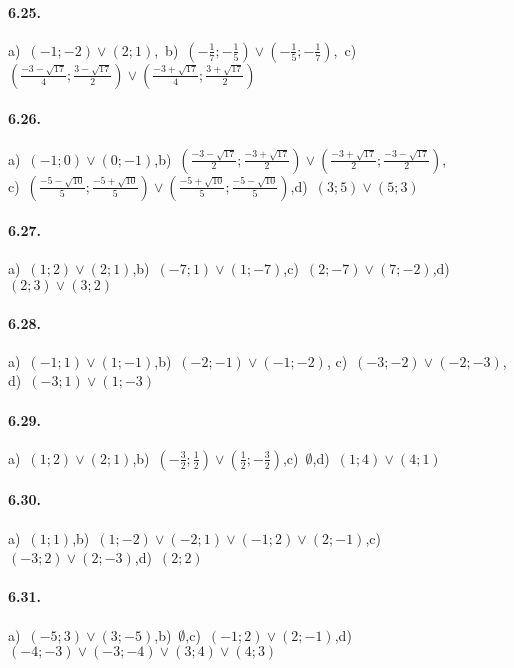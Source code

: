 \paragraph{6.25.} a)~$ (-1; -2)\vee(2;1) $,\, b)~$\left(-\frac 1 7;-\frac 1 5\right)\vee\left(-\frac 1 5;-\frac 1 7\right)$,\, c)~$\left(\frac{-3-\sqrt{17}} 4;{\frac{3-\sqrt{17}} 2}\right)\vee \left(\frac{-3+\sqrt{17}} 4;{\frac{3+\sqrt{17}} 2}\right)$

\paragraph{6.26.} a)~$(-1;0)\vee(0;-1)$,\quad b)~$\left(\frac{-3-\sqrt{17}} 2;\frac{-3+\sqrt{17}} 2\right)\vee\left(\frac{-3+\sqrt{17}} 2;\frac{-3-\sqrt{17}} 2\right)$,\protect\\
\quad c)~$\left(\frac{-5-\sqrt{10}} 5;\frac{-5+\sqrt{10}} 5\right)\vee \left(\frac{-5+\sqrt{10}} 5;\frac{-5-\sqrt{10}} 5\right)$,\quad d)~$(3;5)\vee(5;3)$

\paragraph{6.27.} a)~$(1;2)\vee(2;1)$,\quad b)~$(-7;1)\vee(1;-7)$,\quad c)~$(2;-7)\vee(7;-2)$,\quad d)~$(2;3)\vee(3;2)$

\paragraph{6.28.} a)~$(-1;1)\vee(1;-1)$,\;b)~$(-2;-1)\vee(-1;-2)$,\; c)~$(-3;-2)\vee(-2;-3)$,\; d)~$(-3;1)\vee(1;-3)$

\paragraph{6.29.} a)~$(1;2)\vee(2;1)$,\quad b)~$\left(-\frac 3 2;\frac 1 2\right)\vee\left(\frac 1 2;-\frac 3 2\right)$,\quad c)~$\emptyset$,\quad d)~$(1;4)\vee(4;1)$

\paragraph{6.30.} a)~$(1;1)$,\quad b)~$(1;-2)\vee(-2;1)\vee(-1;2)\vee(2;-1)$,\quad c)~$(-3;2)\vee(2;-3)$,\quad d)~$(2;2)$

\paragraph{6.31.} a)~$(-5;3)\vee(3;-5)$,\quad b)~$\emptyset$,\quad c)~$(-1;2)\vee(2;-1)$,\quad d)~$(-4;-3)\vee(-3;-4)\vee(3;4)\vee(4;3)$

